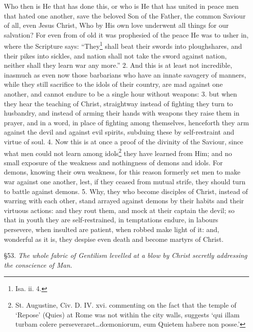 Who then is He that has done this, or who is He that has united in peace men that hated one another, save the beloved Son of the Father, the common Saviour of all, even Jesus Christ, Who by His own love underwent all things for our salvation? For even from of old it was prophesied of the peace He was to usher in, where the Scripture says: “They\footnote{Isa. ii. 4.} shall beat their swords into ploughshares, and their pikes into sickles, and nation shall not take the sword against nation, neither shall they learn war any more.” 2. And this is at least not incredible, inasmuch as even now those barbarians who have an innate savagery of manners, while they still sacrifice to the idols of their country, are mad against one another, and cannot endure to be a single hour without weapons: 3. but when they hear the teaching of Christ, straightway instead of fighting they turn to husbandry, and instead of arming their hands with weapons they raise them in prayer, and in a word, in place of fighting among themselves, henceforth they arm against the devil and against evil spirits, subduing these by self-restraint and virtue of soul. 4. Now this is at once a proof of the divinity of the Saviour, since what men could not learn among idols\footnote{St. Augustine, Civ. D. IV. xvi. commenting on the fact that the temple of ‘Repose’ (Quies) at Rome was not within the city walls, suggests ‘qui illam turbam colere perseveraret…dœmoniorum, eum Quietem habere non posse.’} they have learned from Him; and no small exposure of the weakness and nothingness of demons and idols. For demons, knowing their own weakness, for this reason formerly set men to make war against one another, lest, if they ceased from mutual strife, they should turn to battle against demons. 5. Why, they who become disciples of Christ, instead of warring with each other, stand arrayed against demons by their habits and their virtuous actions: and they rout them, and mock at their captain the devil; so that in youth they are self-restrained, in temptations endure, in labours persevere, when insulted are patient, when robbed make light of it: and, wonderful as it is, they despise even death and become martyrs of Christ.


§53. \emph{The whole fabric of Gentilism levelled at a blow by Christ secretly addressing the conscience of Man.}

